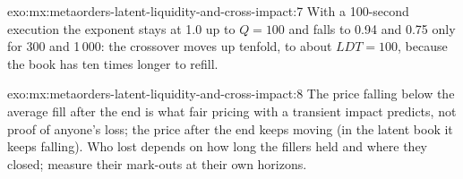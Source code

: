 \begin{solution}{exo:mx:metaorders-latent-liquidity-and-cross-impact:7}
With a 100-second execution the exponent stays at 1.0 up to $Q=100$ and falls to 0.94 and 0.75 only for 300 and 1\,000: the crossover moves up tenfold, to
about $LDT=100$, because the book has ten times longer to refill.
\end{solution}

\begin{solution}{exo:mx:metaorders-latent-liquidity-and-cross-impact:8}
The price falling below the average fill after the end is what fair pricing with a transient impact predicts, not proof of anyone's loss; the price after
the end keeps moving (in the latent book it keeps falling). Who lost depends on how long the fillers held and where they closed; measure their mark-outs
at their own horizons.
\end{solution}

